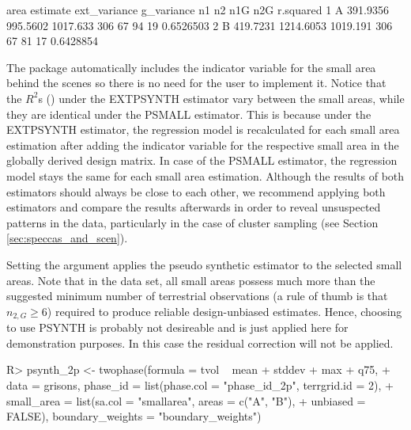 \begin{small}
\begin{Schunk}
\begin{Soutput}
  area estimate ext_variance g_variance  n1 n2 n1G n2G r.squared
1    A 391.9356     995.5602   1017.633 306 67  94  19 0.6526503
2    B 419.7231    1214.6053   1019.191 306 67  81  17 0.6428854
\end{Soutput}
\end{Schunk}
\end{small}

The  package automatically includes the indicator variable for the small area behind the scenes so there is no need for the user to implement it. Notice that the $R^2$s () under the EXTPSYNTH estimator vary between the small areas, while they are identical under the PSMALL estimator. This is because under the EXTPSYNTH estimator, the regression model is recalculated for each small area estimation after adding the indicator variable for the respective small area in the globally derived design matrix. In case of the PSMALL estimator, the regression model stays the same for each small area estimation. Although the results of both estimators should always be close to each other, we recommend applying both estimators and compare the results afterwards in order to reveal unsuspected patterns in the data, particularly in the case of cluster sampling (see Section \ref{sec:speccas_and_scen}).\par

Setting the argument  applies the pseudo synthetic estimator to the selected small areas. Note that in the  data set, all small areas possess much more than the suggested minimum number of terrestrial observations (a rule of thumb is that $n_{2,G} $) required to produce reliable design-unbiased estimates. Hence, choosing to use PSYNTH is probably not desireable and is just applied here for demonstration purposes. In this case the residual correction will not be applied.


\begin{small}
\begin{Schunk}
\begin{Sinput}
R> psynth_2p <- twophase(formula = tvol ~ mean + stddev + max + q75, 
+    data = grisons, phase_id = list(phase.col = "phase_id_2p", terrgrid.id = 2),
+    small_area = list(sa.col = "smallarea", areas = c("A", "B"),
+    unbiased = FALSE), boundary_weights = "boundary_weights")
\end{Sinput}
\end{Schunk}
\end{small}

